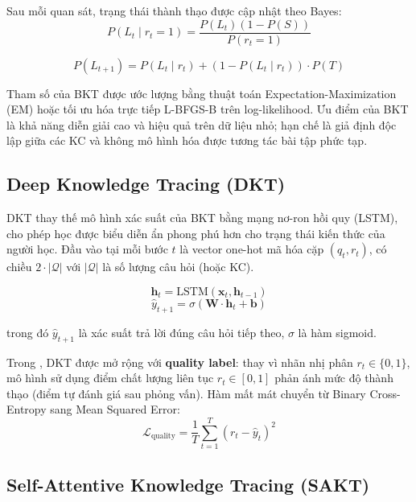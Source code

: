 Sau mỗi quan sát, trạng thái thành thạo được cập nhật theo Bayes:
\begin{equation}
  P(L_t \mid r_t = 1) = \frac{P(L_t)(1 - P(S))}{P(r_t = 1)}
\end{equation}

\begin{equation}
  P(L_{t+1}) = P(L_t \mid r_t) + (1 - P(L_t \mid r_t)) \cdot P(T)
\end{equation}

Tham số của BKT được ước lượng bằng thuật toán Expectation-Maximization (EM) hoặc tối ưu hóa trực tiếp L-BFGS-B trên log-likelihood. Ưu điểm của BKT là khả năng diễn giải cao và hiệu quả trên dữ liệu nhỏ; hạn chế là giả định độc lập giữa các KC và không mô hình hóa được tương tác bài tập phức tạp.

\subsection{Deep Knowledge Tracing (DKT)}
\label{subsec:dkt}

DKT \cite{piech2015deep} thay thế mô hình xác suất của BKT bằng mạng nơ-ron hồi quy (LSTM), cho phép học được biểu diễn ẩn phong phú hơn cho trạng thái kiến thức của người học. Đầu vào tại mỗi bước $t$ là vector one-hot mã hóa cặp $(q_t, r_t)$, có chiều $2 \cdot |\mathcal{Q}|$ với $|\mathcal{Q}|$ là số lượng câu hỏi (hoặc KC).

\begin{equation}
  \mathbf{h}_t = \text{LSTM}(\mathbf{x}_t, \mathbf{h}_{t-1})
\end{equation}
\begin{equation}
  \hat{y}_{t+1} = \sigma(\mathbf{W} \cdot \mathbf{h}_t + \mathbf{b})
\end{equation}

trong đó $\hat{y}_{t+1}$ là xác suất trả lời đúng câu hỏi tiếp theo, $\sigma$ là hàm sigmoid.

Trong \system{}, DKT được mở rộng với \textbf{quality label}: thay vì nhãn nhị phân $r_t \in \{0,1\}$, mô hình sử dụng điểm chất lượng liên tục $r_t \in [0, 1]$ phản ánh mức độ thành thạo (điểm tự đánh giá sau phỏng vấn). Hàm mất mát chuyển từ Binary Cross-Entropy sang Mean Squared Error:
\begin{equation}
  \mathcal{L}_{\text{quality}} = \frac{1}{T} \sum_{t=1}^{T} (r_t - \hat{y}_t)^2
\end{equation}

\subsection{Self-Attentive Knowledge Tracing (SAKT)}
\label{subsec:sakt}

